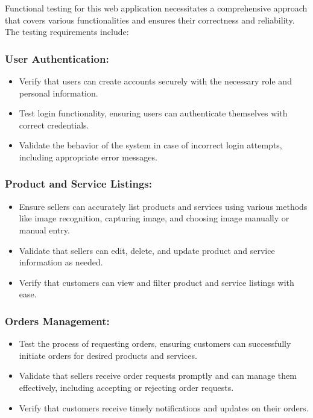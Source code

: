 Functional testing for this web application necessitates a comprehensive approach that covers various functionalities and ensures their correctness and reliability. The testing requirements include:

\subsubsection{User Authentication:}
	\begin{itemize}
		\item Verify that users can create accounts securely with the necessary role and personal information.
		\item Test login functionality, ensuring users can authenticate themselves with correct credentials.
		\item Validate the behavior of the system in case of incorrect login attempts, including appropriate error messages.
	\end{itemize}
	
\subsubsection{Product and Service Listings:}
	\begin{itemize}
		\item Ensure sellers can accurately list products and services using various methods like image recognition, capturing image, and choosing image manually or manual entry.
		\item Validate that sellers can edit, delete, and update product and service information as needed.
		\item Verify that customers can view and filter product and service listings with ease.
	\end{itemize}
	
\subsubsection{Orders Management:}
	\begin{itemize}
		\item Test the process of requesting orders, ensuring customers can successfully initiate orders for desired products and services.
		\item Validate that sellers receive order requests promptly and can manage them effectively, including accepting or rejecting order requests.
		\item Verify that customers receive timely notifications and updates on their orders.
	\end{itemize}
	
